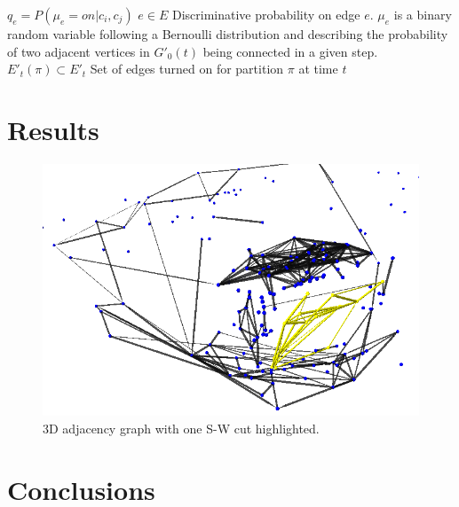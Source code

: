 \documentclass[10pt,letterpaper]{article}
\begin{document}
$q_e=P(\mu_e=on|c_i,c_j)$ $e\in{E}$ Discriminative probability on edge $e$. $\mu_e$ is a binary random variable following a Bernoulli distribution and describing the probability of two adjacent vertices in $G'_0(t)$ being connected in a given step.
$E'_t(\pi)\subset{E'_t}$ Set of edges turned on for partition $\pi$ at time $t$
\section{Results}

\cite{sturm12iros}
\begin{figure}[here]
\begin{center}
\includegraphics[width=.9\linewidth]{graph1.png}
\end{center}

\caption{3D adjacency graph with one S-W cut highlighted.}
\label{fig:highGraph}
\end{figure}

\section{Conclusions}



\end{document}
